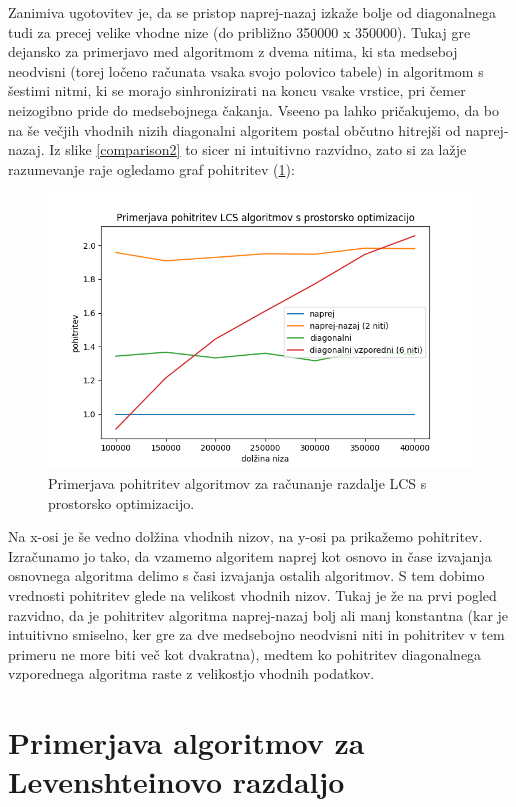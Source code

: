 \documentclass[a4paper,12pt,openright]{book}
\begin{document}
Zanimiva ugotovitev je, da se pristop naprej-nazaj izkaže bolje od diagonalnega tudi za precej velike vhodne nize (do približno 350000 x 350000). Tukaj gre dejansko za primerjavo med algoritmom z dvema nitima, ki sta medseboj neodvisni (torej ločeno računata vsaka svojo polovico tabele) in algoritmom s šestimi nitmi, ki se morajo sinhronizirati na koncu vsake vrstice, pri čemer neizogibno pride do medsebojnega čakanja. Vseeno pa lahko pričakujemo, da bo na še večjih vhodnih nizih diagonalni algoritem postal občutno hitrejši od naprej-nazaj. Iz slike \ref{comparison2} to sicer ni intuitivno razvidno, zato si za lažje razumevanje raje ogledamo graf pohitritev (\ref{comparison31}): 

\begin{figure}[htb]
\centering
\includegraphics[width=1.0\textwidth]{plots/LCSacceleration.png}
\caption{Primerjava pohitritev algoritmov za računanje razdalje LCS s prostorsko optimizacijo.}
\label{comparison31}
\end{figure}

Na x-osi je še vedno dolžina vhodnih nizov, na y-osi pa prikažemo pohitritev. Izračunamo jo tako, da vzamemo algoritem naprej kot osnovo in čase izvajanja osnovnega algoritma delimo s časi izvajanja ostalih algoritmov. S tem dobimo vrednosti pohitritev glede na velikost vhodnih nizov. Tukaj je že na prvi pogled razvidno, da je pohitritev algoritma naprej-nazaj bolj ali manj konstantna (kar je intuitivno smiselno, ker gre za dve medsebojno neodvisni niti in pohitritev v tem primeru ne more biti več kot dvakratna), medtem ko pohitritev diagonalnega vzporednega algoritma raste z velikostjo vhodnih podatkov. 

\section{Primerjava algoritmov za Levenshteinovo razdaljo}
\end{document}
